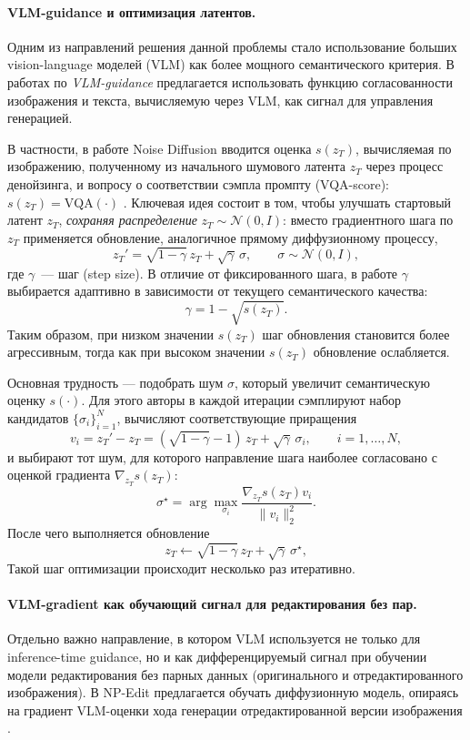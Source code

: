 \paragraph{VLM-guidance и оптимизация латентов.}
Одним из направлений решения данной проблемы стало использование больших vision-language моделей (VLM) как более мощного семантического критерия. В работах по \textit{VLM-guidance} предлагается использовать функцию согласованности изображения и текста, вычисляемую через VLM, как сигнал для управления генерацией.

В частности, в работе Noise Diffusion вводится оценка $s(z_T)$, вычисляемая по изображению, полученному из начального шумового латента $z_T$ через процесс денойзинга, и вопросу о соответствии сэмпла промпту (VQA-score): $s(z_T)=\mathrm{VQA}(\cdot)$ \cite{miao2024noisediffusion}. Ключевая идея состоит в том, чтобы улучшать стартовый латент $z_T$, \emph{сохраняя распределение} $z_T \sim \mathcal{N}(0,I)$: вместо градиентного шага по $z_T$ применяется обновление, аналогичное прямому диффузионному процессу,
\[
z_T' = \sqrt{1-\gamma}\, z_T + \sqrt{\gamma}\, \sigma,
\qquad \sigma \sim \mathcal{N}(0,I),
\]
где $\gamma$~--- шаг (step size). В отличие от фиксированного шага, в работе $\gamma$ выбирается адаптивно в зависимости от текущего семантического качества:
\[
\gamma = 1 - \sqrt{s(z_T)}.
\]
Таким образом, при низком значении $s(z_T)$ шаг обновления становится более агрессивным, тогда как при высоком значении $s(z_T)$ обновление ослабляется.

Основная трудность --- подобрать шум $\sigma$, который увеличит семантическую оценку $s(\cdot)$. Для этого авторы в каждой итерации сэмплируют набор кандидатов $\{\sigma_i\}_{i=1}^N$, вычисляют соответствующие приращения
\[
v_i = z_T' - z_T
= (\sqrt{1-\gamma}-1)\,z_T + \sqrt{\gamma}\,\sigma_i,
\qquad i=1,\dots,N,
\]
и выбирают тот шум, для которого направление шага наиболее согласовано с оценкой градиента $\nabla_{z_T}s(z_T)$:
\[
\sigma^\star
= \arg\max_{\sigma_i}
\frac{\nabla_{z_T}s(z_T) v_i}{\lVert v_i\rVert_2^2}.
\]
После чего выполняется обновление
\[
z_T \leftarrow \sqrt{1-\gamma}\,z_T + \sqrt{\gamma}\,\sigma^\star,
\]
Такой шаг оптимизации происходит несколько раз итеративно.

\paragraph{VLM-gradient как обучающий сигнал для редактирования без пар.}
Отдельно важно направление, в котором VLM используется не только для inference-time guidance, но и как дифференцируемый сигнал при обучении модели редактирования без парных данных (оригинального и отредактированного изображения). В NP-Edit предлагается обучать диффузионную модель, опираясь на градиент VLM-оценки хода генерации отредактированной версии изображения \cite{kumari2025learning}.

